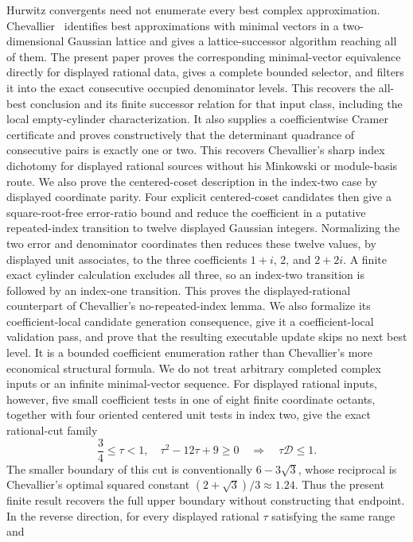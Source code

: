 \documentclass[11pt]{article}
\begin{document}
Hurwitz convergents need not enumerate every best complex approximation.
Chevallier~\cite{ChevallierGaussLattices} identifies best approximations with
minimal vectors in a two-dimensional Gaussian lattice and gives a
lattice-successor algorithm reaching all of them.  The present paper proves
the corresponding minimal-vector equivalence directly for displayed
rational data, gives a complete bounded selector, and filters it into the
exact consecutive occupied denominator levels.  This recovers the all-best
conclusion and its finite successor relation for that input class, including
the local empty-cylinder characterization.  It also supplies a coefficientwise
Cramer certificate and proves constructively that the determinant quadrance
of consecutive pairs is exactly one or two.  This recovers Chevallier's sharp
index dichotomy for displayed rational sources without his Minkowski or
module-basis route.  We also prove the centered-coset description in the
index-two case by displayed coordinate parity.  Four explicit centered-coset
candidates then give a square-root-free error-ratio bound and reduce the
coefficient in a putative repeated-index transition to twelve displayed
Gaussian integers.  Normalizing the two error and denominator coordinates
then reduces these twelve values, by displayed unit associates, to the three
coefficients $1+i$, $2$, and $2+2i$.  A finite exact cylinder calculation
excludes all three, so an index-two transition is followed by an index-one
transition.  This proves the displayed-rational counterpart of Chevallier's
no-repeated-index lemma.  We also formalize its coefficient-local candidate
generation consequence, give it a coefficient-local validation pass, and
prove that the resulting executable update skips no next best level.  It is
a bounded coefficient enumeration rather than Chevallier's more economical
structural formula.  We do not treat arbitrary
completed complex inputs or an infinite minimal-vector sequence.
For displayed rational inputs, however, five small coefficient tests in one
of eight finite coordinate octants, together with four oriented centered
unit tests in index two, give the exact rational-cut family
\[
 \frac34\le\tau<1,\quad \tau^2-12\tau+9\ge0
 \quad\Longrightarrow\quad \tau\mathcal D\le1.
\]
The smaller boundary of this cut is conventionally $6-3\sqrt3$, whose
reciprocal is Chevallier's optimal squared constant
$(2+\sqrt3)/3\approx1.24$.  Thus the present finite result recovers the full
upper boundary without constructing that endpoint.  In the reverse
direction, for every displayed rational $\tau$ satisfying the same range and
\end{document}
